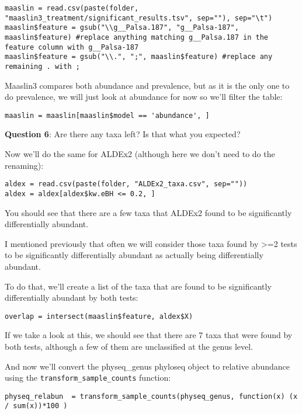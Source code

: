 \documentclass[
]{book}
\begin{document}
\begin{verbatim}
maaslin = read.csv(paste(folder, "maaslin3_treatment/significant_results.tsv", sep=""), sep="\t")
maaslin$feature = gsub("\\g__Palsa.187", "g__Palsa-187", maaslin$feature) #replace anything matching g__Palsa.187 in the feature column with g__Palsa-187
maaslin$feature = gsub("\\.", ";", maaslin$feature) #replace any remaining . with ;
\end{verbatim}

Maaslin3 compares both abundance and prevalence, but as it is the only one to do prevalence, we will just look at abundance for now so we'll filter the table:

\begin{verbatim}
maaslin = maaslin[maaslin$model == 'abundance', ]
\end{verbatim}

\textbf{Question 6}: Are there any taxa left? Is that what you expected?

Now we'll do the same for ALDEx2 (although here we don't need to do the renaming):

\begin{verbatim}
aldex = read.csv(paste(folder, "ALDEx2_taxa.csv", sep=""))
aldex = aldex[aldex$kw.eBH <= 0.2, ]
\end{verbatim}

You should see that there are a few taxa that ALDEx2 found to be significantly differentially abundant.

I mentioned previously that often we will consider those taxa found by \textgreater=2 tests to be significantly differentially abundant as actually being differentially abundant.

To do that, we'll create a list of the taxa that are found to be significantly differentially abundant by both tests:

\begin{verbatim}
overlap = intersect(maaslin$feature, aldex$X)
\end{verbatim}

If we take a look at this, we should see that there are 7 taxa that were found by both tests, although a few of them are unclassified at the genus level.

And now we'll convert the physeq\_genus phyloseq object to relative abundance using the \texttt{transform\_sample\_counts} function:

\begin{verbatim}
physeq_relabun  = transform_sample_counts(physeq_genus, function(x) (x / sum(x))*100 )
\end{verbatim}
\end{document}
